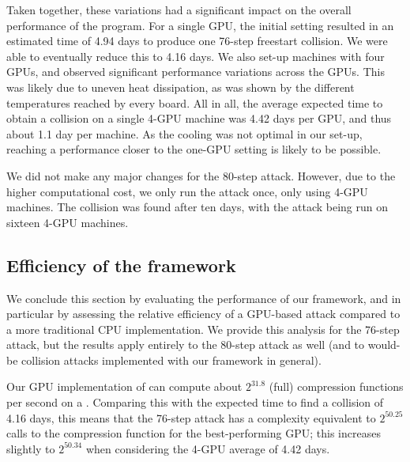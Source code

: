 Taken together, these variations had a significant impact on the overall performance of the program. For a single GPU, the initial setting resulted in an estimated
time of 4.94 days to produce one 76-step freestart collision. We were able to eventually reduce this to 4.16 days. We also set-up machines with four GPUs, and observed significant
performance variations across the GPUs. This was likely due to uneven heat dissipation, as was shown by the different temperatures reached by every board. All in all, the
average expected time to obtain a collision on a single 4-GPU machine was 4.42 days per GPU, and thus about 1.1 day per machine. As the cooling was not optimal in our set-up,
reaching a performance closer to the one-GPU setting is likely to be possible.

We did not make any major changes for the 80-step attack. However, due to the higher computational cost, we only run the attack once, only using 4-GPU machines.
The collision was found after ten days, with the attack being run on sixteen 4-GPU machines.

\FloatBarrier

\subsection{Efficiency of the framework}
\label{sec:effi_fw}

We conclude this section by evaluating the performance of our framework, and in particular by assessing the relative efficiency of a GPU-based attack compared to a more traditional CPU implementation.
We provide this analysis for the 76-step attack, but the results apply entirely to the 80-step attack as well (and to would-be \shaone collision attacks implemented with our framework in general).


Our GPU implementation of \shaone can compute about $2^{31.8}$ (full) \shaone compression functions per second on a \gtx.
Comparing this with the expected time to find a collision of 4.16 days, this means that the 76-step attack has a complexity equivalent to $2^{50.25}$ calls to the compression function for the
best-performing GPU; this increases slightly to $2^{50.34}$ when considering the 4-GPU average of 4.42 days.

